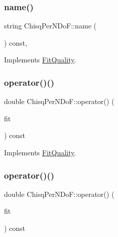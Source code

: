 \subsubsection{\texorpdfstring{name()}{name()}\hspace{0.1cm}{\footnotesize\ttfamily [2/2]}}
{\footnotesize\ttfamily string Chisq\+Per\+N\+Do\+F\+::name (\begin{DoxyParamCaption}{ }\end{DoxyParamCaption}) const\hspace{0.3cm}{\ttfamily [inline]}, {\ttfamily [virtual]}}



Implements \mbox{\hyperlink{classFitQuality_a3423e236f25d68cf822094b363a74780}{Fit\+Quality}}.

\mbox{\label{classChisqPerNDoF_a4d45c53a895115c4fe318d22c44228e4}} 
\subsubsection{\texorpdfstring{operator()()}{operator()()}\hspace{0.1cm}{\footnotesize\ttfamily [1/2]}}
{\footnotesize\ttfamily double Chisq\+Per\+N\+Do\+F\+::operator() (\begin{DoxyParamCaption}\item[{const \mbox{\hyperlink{classAvgFit}{Avg\+Fit}} \&}]{fit }\end{DoxyParamCaption}) const\hspace{0.3cm}{\ttfamily [virtual]}}



Implements \mbox{\hyperlink{classFitQuality_a49a49e1206709d71c3ead41e981bb848}{Fit\+Quality}}.

\mbox{\label{classChisqPerNDoF_a4d45c53a895115c4fe318d22c44228e4}} 
\subsubsection{\texorpdfstring{operator()()}{operator()()}\hspace{0.1cm}{\footnotesize\ttfamily [2/2]}}
{\footnotesize\ttfamily double Chisq\+Per\+N\+Do\+F\+::operator() (\begin{DoxyParamCaption}\item[{const \mbox{\hyperlink{classAvgFit}{Avg\+Fit}} \&}]{fit }\end{DoxyParamCaption}) const\hspace{0.3cm}{\ttfamily [virtual]}}



